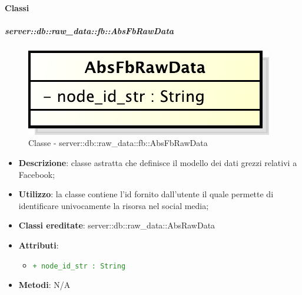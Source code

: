 		\paragraph{Classi} %
			\subparagraph{server::db::raw\_data::fb::AbsFbRawData} %
			\label{subp:server_db_raw_data_fb_absfbrawdata}
				\begin{figure}[htbp]
					\centering
					\centerline{\includegraphics[scale=0.75]{./images/server/classes/db/abs_fb_raw_data.pdf}}
					\caption{Classe - server::db::raw\_data::fb::AbsFbRawData}
				\end{figure}
				\begin{itemize}
					\item \textbf{Descrizione}: classe astratta che definisce il modello dei dati grezzi relativi a Facebook;
					\item \textbf{Utilizzo}: la classe contiene l'id fornito dall'utente il quale permette di identificare univocamente la risorsa nel social media;
					\item \textbf{Classi ereditate}: server::db::raw\_data::AbsRawData
					\item \textbf{Attributi}:
					\begin{itemize}
						\item \textcolor{forestgreen}{\texttt{+ node\_id\_str : String}}
					\end{itemize}
					\item \textbf{Metodi}: N/A
				\end{itemize}


